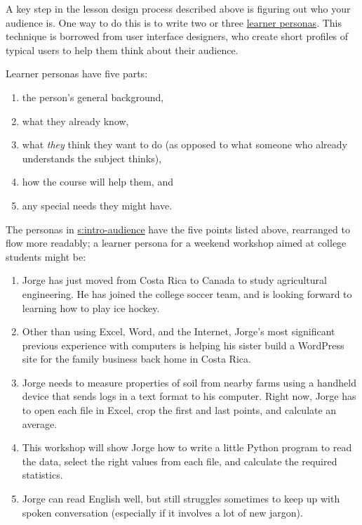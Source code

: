 A key step in the lesson design process described above is figuring
out who your audience is. One way to do this is to write two or three
\protect\hyperlink{g:learner-persona}{learner personas}. This technique is
borrowed from user interface designers, who create short profiles of
typical users to help them think about their audience.

Learner personas have five parts:

\begin{enumerate}
\tightlist
\item
  the person's general background,
\item
  what they already know,
\item
  what \emph{they} think they want to do (as opposed to what someone who already
  understands the subject thinks),
\item
  how the course will help them, and
\item
  any special needs they might have.
\end{enumerate}

The personas in \protect\hyperlink{SECTION}{s:intro-audience} have the five points listed above,
rearranged to flow more readably; a learner persona for a weekend workshop aimed
at college students might be:

\begin{enumerate}
\item
  Jorge has just moved from Costa Rica to Canada to study
  agricultural engineering. He has joined the college soccer team,
  and is looking forward to learning how to play ice hockey.
\item
  Other than using Excel, Word, and the Internet, Jorge's most
  significant previous experience with computers is helping his
  sister build a WordPress site for the family business back home in
  Costa Rica.
\item
  Jorge needs to measure properties of soil from nearby farms using a
  handheld device that sends logs in a text format to his computer.
  Right now, Jorge has to open each file in Excel, crop the first and
  last points, and calculate an average.
\item
  This workshop will show Jorge how to write a little Python program
  to read the data, select the right values from each file, and
  calculate the required statistics.
\item
  Jorge can read English well, but still struggles sometimes to keep
  up with spoken conversation (especially if it involves a lot of new
  jargon).
\end{enumerate}

